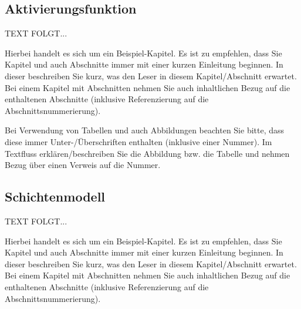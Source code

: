 \documentclass[a4paper,12pt,oneside]{article}
\begin{document}
  \newpage
  \subsection{Aktivierungsfunktion}\label{Aktivierungsfunktion}
     TEXT FOLGT... 
     
    \vspace{1cm}
 \begin{tcolorbox}[title={Das Kapitel/der Abschnitt}]
Hierbei handelt es sich um ein Beispiel-Kapitel. Es ist zu empfehlen, dass Sie Kapitel und auch Abschnitte immer mit einer kurzen Einleitung beginnen. In dieser beschreiben Sie kurz, was den Leser in diesem Kapitel/Abschnitt erwartet. Bei einem Kapitel mit Abschnitten nehmen Sie auch inhaltlichen Bezug auf die enthaltenen Abschnitte (inklusive Referenzierung auf die Abschnittsnummerierung).
  \end{tcolorbox}
  
    \vspace{1cm}
 \begin{tcolorbox}[title={Abbildungen, Tabellen \& Co.}]
Bei Verwendung von Tabellen und auch Abbildungen beachten Sie bitte, dass diese immer Unter-/Überschriften enthalten (inklusive einer Nummer). Im Textfluss erklären/beschreiben Sie die Abbildung bzw. die Tabelle und nehmen Bezug über einen Verweis auf die Nummer.
  \end{tcolorbox}

  \newpage
  \subsection{Schichtenmodell}\label{Schichtenmodell}
     TEXT FOLGT... 
     
    \vspace{1cm}
 \begin{tcolorbox}[title={Das Kapitel/der Abschnitt}]
Hierbei handelt es sich um ein Beispiel-Kapitel. Es ist zu empfehlen, dass Sie Kapitel und auch Abschnitte immer mit einer kurzen Einleitung beginnen. In dieser beschreiben Sie kurz, was den Leser in diesem Kapitel/Abschnitt erwartet. Bei einem Kapitel mit Abschnitten nehmen Sie auch inhaltlichen Bezug auf die enthaltenen Abschnitte (inklusive Referenzierung auf die Abschnittsnummerierung).
  \end{tcolorbox}
  
\end{document}
